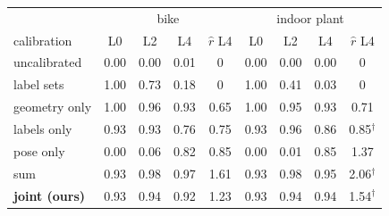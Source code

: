\begin{tabular}{l|ccc|c|ccc|c}
\toprule
 & \multicolumn{4}{c|}{bike} & \multicolumn{4}{c}{indoor plant} \\
calibration & L0 & L2 & L4 & $\hat r$ L4 & L0 & L2 & L4 & $\hat r$ L4 \\
\midrule
uncalibrated & 0.00 & 0.00 & 0.01 & 0 & 0.00 & 0.00 & 0.00 & 0 \\
label sets~\cite{sundarsingh} & 1.00 & 0.73 & 0.18 & 0 & 1.00 & 0.41 & 0.03 & 0 \\
geometry only & 1.00 & 0.96 & 0.93 & 0.65 & 1.00 & 0.95 & 0.93 & 0.71 \\
labels only & 0.93 & 0.93 & 0.76 & 0.75 & 0.93 & 0.96 & 0.86 & 0.85$^\dagger$ \\
pose only & 0.00 & 0.06 & 0.82 & 0.85 & 0.00 & 0.01 & 0.85 & 1.37 \\
sum & 0.93 & 0.98 & 0.97 & 1.61 & 0.93 & 0.98 & 0.95 & 2.06$^\dagger$ \\
\textbf{joint (ours)} & 0.93 & 0.94 & 0.92 & 1.23 & 0.93 & 0.94 & 0.94 & 1.54$^\dagger$ \\
\bottomrule
\end{tabular}
